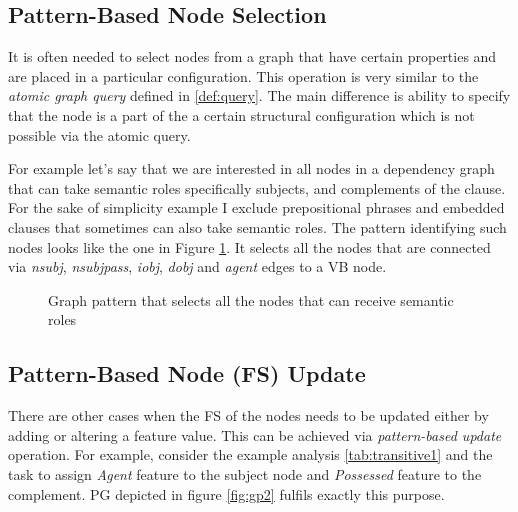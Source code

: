 \subsection{Pattern-Based Node Selection}
It is often needed to select nodes from a graph that have certain properties and are placed in a particular configuration. This operation is very similar to the \textit{atomic graph query} defined in \ref{def:query}. The main difference is ability to specify that the node is a part of the a certain structural configuration which is not possible via the atomic query. 

For example let's say that we are interested in all nodes in a dependency graph that can take semantic roles specifically subjects, and complements of the clause. For the sake of simplicity example I exclude prepositional phrases and embedded clauses that sometimes can also take semantic roles. 
The pattern identifying such nodes looks like the one in Figure \ref{fig:gp3}. It selects all the nodes that are connected via \textit{nsubj}, \textit{nsubjpass}, \textit{iobj}, \textit{dobj} and \textit{agent} edges to a VB node. 

\begin{figure}[hbtp]
\centering
{}
\caption{Graph pattern that selects all the nodes that can receive semantic roles}
\label{fig:gp3}
\end{figure}

\subsection{Pattern-Based Node (FS) Update} 
There are other cases when the FS of the nodes needs to be updated either by adding or altering a feature value. This can be achieved via \textit{pattern-based update} operation. For example, consider the example analysis \ref{tab:transitive1} and the task to assign \textit{Agent} feature to the subject node and \textit{Possessed} feature to the complement. PG depicted in figure \ref{fig:gp2} fulfils exactly this purpose.

